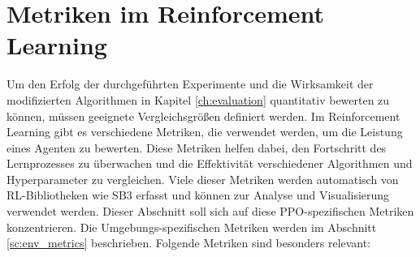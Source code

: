 \section{Metriken im Reinforcement Learning}
Um den Erfolg der durchgeführten Experimente und die Wirksamkeit der modifizierten Algorithmen in Kapitel \ref{ch:evaluation} quantitativ bewerten zu können, müssen geeignete Vergleichsgrößen definiert werden. Im Reinforcement Learning gibt es verschiedene Metriken, die verwendet werden, um die Leistung eines Agenten zu bewerten.
Diese Metriken helfen dabei, den Fortschritt des Lernprozesses zu überwachen und die Effektivität verschiedener Algorithmen und Hyperparameter zu vergleichen.
Viele dieser Metriken werden automatisch von \ac{RL}\hyp{}Bibliotheken wie \ac{SB3} \cite{sb3} erfasst und können zur Analyse und Visualisierung verwendet werden.
Dieser Abschnitt soll sich auf diese \ac{PPO}\hyp{}spezifischen Metriken konzentrieren. Die Umgebungs\hyp{}spezifischen Metriken werden im Abschnitt \ref{sc:env_metrics} beschrieben.
Folgende Metriken \cite{LogExplanation} sind besonders relevant:

